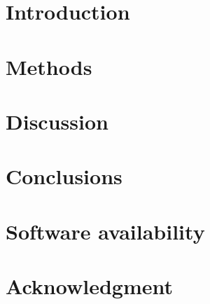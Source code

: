 \documentclass{cas-dc} %
\numberwithin{equation}{section}
\begin{document}

\maketitle

\section{Introduction}

\section{Methods}



\section{Discussion}

\section{Conclusions}

\section*{Software availability}

\section*{Acknowledgment}


\sloppy %
\printbibliography
\fussy %

%
%
\end{document}
